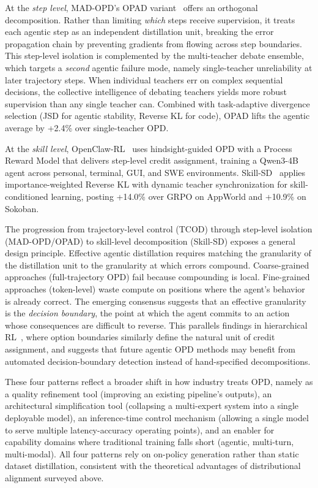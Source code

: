 \documentclass{article} %
\begin{document}
At the \emph{step level}, MAD-OPD's OPAD variant~\citep{wang2026madopd} offers an orthogonal decomposition. Rather than limiting \emph{which} steps receive supervision, it treats each agentic step as an independent distillation unit, breaking the error propagation chain by preventing gradients from flowing across step boundaries. This step-level isolation is complemented by the multi-teacher debate ensemble, which targets a \emph{second} agentic failure mode, namely single-teacher unreliability at later trajectory steps. When individual teachers err on complex sequential decisions, the collective intelligence of debating teachers yields more robust supervision than any single teacher can. Combined with task-adaptive divergence selection (JSD for agentic stability, Reverse KL for code), OPAD lifts the agentic average by +2.4\% over single-teacher OPD.

At the \emph{skill level}, OpenClaw-RL~\citep{wang2026openclawrl} uses hindsight-guided OPD with a Process Reward Model that delivers step-level credit assignment, training a Qwen3-4B agent across personal, terminal, GUI, and SWE environments. Skill-SD~\citep{wang2026skillsd} applies importance-weighted Reverse KL with dynamic teacher synchronization for skill-conditioned learning, posting +14.0\% over GRPO on AppWorld and +10.9\% on Sokoban.

The progression from trajectory-level control (TCOD) through step-level isolation (MAD-OPD/OPAD) to skill-level decomposition (Skill-SD) exposes a general design principle. Effective agentic distillation requires matching the granularity of the distillation unit to the granularity at which errors compound. Coarse-grained approaches (full-trajectory OPD) fail because compounding is local. Fine-grained approaches (token-level) waste compute on positions where the agent's behavior is already correct. The emerging consensus suggests that an effective granularity is the \emph{decision boundary}, the point at which the agent commits to an action whose consequences are difficult to reverse. This parallels findings in hierarchical RL~\citep{ross2011reduction}, where option boundaries similarly define the natural unit of credit assignment, and suggests that future agentic OPD methods may benefit from automated decision-boundary detection instead of hand-specified decompositions.

These four patterns reflect a broader shift in how industry treats OPD, namely as a quality refinement tool (improving an existing pipeline's outputs), an architectural simplification tool (collapsing a multi-expert system into a single deployable model), an inference-time control mechanism (allowing a single model to serve multiple latency-accuracy operating points), and an enabler for capability domains where traditional training falls short (agentic, multi-turn, multi-modal). All four patterns rely on on-policy generation rather than static dataset distillation, consistent with the theoretical advantages of distributional alignment surveyed above.
\end{document}
